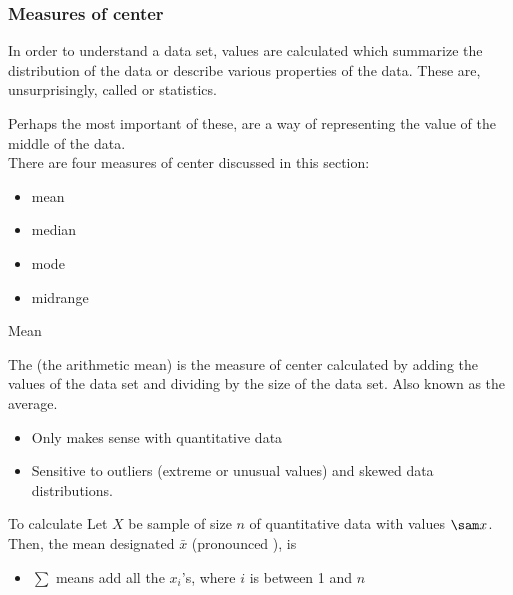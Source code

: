 \documentclass[xcolor=table, aspectratio=169, bigger, handout]{beamer}
\begin{document}
\begin{frame}
\frametitle{Measures of center}
\begin{block}{}
In order to understand a data set, values are calculated which summarize the distribution of the data or describe various properties of the data. These are, unsurprisingly, called  or  statistics.
\end{block}
\pause
\begin{block}{}
Perhaps the most important of these,  are a way of  representing the value of the middle of the data.\\
\medskip
There are four measures of center discussed in this section:
\begin{itemize}
\item mean
\item median
\item mode
\item midrange
\end{itemize} 
\end{block}
\end{frame}

\begin{frame}{Mean}
\begin{block}{}
The  (the arithmetic mean) is the measure of center calculated by adding the values of the data set and dividing by the size of the data set. Also known as the average.
\begin{itemize}
\item Only makes sense with quantitative data
\item Sensitive to outliers (extreme or unusual values) and skewed data distributions.
\end{itemize}
\end{block}

\pause
\begin{block}{To calculate}
Let $X$ be sample of size $n$ of quantitative data with values $\sam x$. Then, the mean designated $\bar x$ (pronounced ), is\\ \smallskip
{}
\begin{itemize}
\item $\sum$ means add all the $x_i$'s, where $i$ is between 1 and $n$
\end{itemize}
\end{block}
\end{frame}
\end{document}
